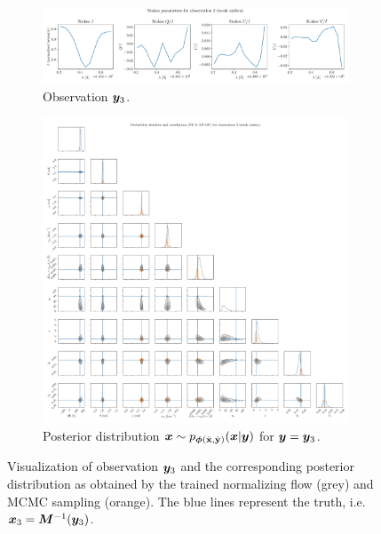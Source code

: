 \documentclass[a4paper,11pt]{report}
\begin{document}
\begin{figure}[h!]
	\centering
	\begin{subfigure}[t]{\textwidth}
	\centering
	\includegraphics[width=\textwidth]{figures/nf-milne-eddington-example-6-corner-spectrum-3-nf-nflows-piecewisequadratic.pdf}
    \caption{Observation $\bm{y}_3$.}
	\end{subfigure}
	\begin{subfigure}[t]{\textwidth}
	\centering
	\includegraphics[width=\textwidth]{figures/nf-milne-eddington-example-6-corner-3-nf-mcmc-nflows-piecewisequadratic.pdf}
    \caption{Posterior distribution $\bm{x}\sim p_{\bm{\phi}(\hat{\boldsymbol{\mathbf{x}}},\hat{\boldsymbol{\mathbf{y}}})}(\bm{x}|\bm{y})$ for $\bm{y} = \bm{y}_3$.}
	\end{subfigure}
\cprotect\caption{Visualization of observation $\bm{y}_3$ and the corresponding posterior distribution as obtained by the trained normalizing flow (grey) and MCMC sampling (orange). The blue lines represent the truth, i.e. $\bm{x}_3 = \bm{M}^{-1}(\bm{y}_3)$.}
\label{fig:nf-milne-eddington-example-6-corner-3-nf-piecewisequadratic-results}
\end{figure}
\end{document}
